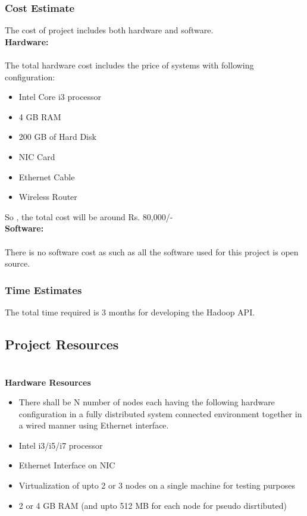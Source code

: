 \documentclass[oneside,a4paper,12pt]{report}
\begin{document}
\subsubsection{Cost Estimate}
The cost of project includes both hardware and software. \\[4ex]
\textbf{Hardware:} \\ \\
The total hardware cost includes the price of systems with following configuration: \\
\begin{itemize}
\item Intel Core i3 processor
\item 4 GB RAM
\item 200 GB of Hard Disk
\item NIC Card
\item Ethernet Cable
\item Wireless Router  \\
\end{itemize} 

So , the total cost will be around Rs. 80,000/- \\

\noindent \textbf{Software:} \\ \\
There is no software cost as such as all the software used for this project is open
source.

\subsubsection{Time Estimates}
The total time required is 3 months for developing the Hadoop API.

\subsection{Project Resources}
\paragraph{}
\textbf{ \\ Hardware Resources}
\begin{itemize}
\item There shall be N number of nodes each having the following hardware configuration in a fully distributed system connected environment together in a wired manner using Ethernet interface.
\item Intel i3/i5/i7 processor
\item Ethernet Interface on NIC
\item Virtualization of upto 2 or 3 nodes on a single machine for testing purposes
\item 2 or 4 GB RAM (and upto 512 MB for each node for pseudo disrtibuted) \\[3ex]
\end{itemize}
\end{document}
